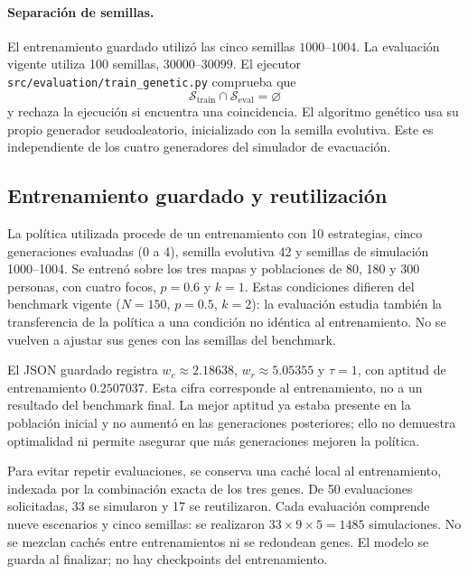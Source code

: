 \documentclass[11pt,letterpaper]{article}
\begin{document}
\paragraph{Separación de semillas.}
El entrenamiento guardado utilizó las cinco semillas $1000$--$1004$. La evaluación vigente utiliza 100 semillas, $30000$--$30099$. El ejecutor \texttt{src/evaluation/train\_genetic.py} comprueba que
\[
    \mathcal{S}_{\mathrm{train}}
    \cap
    \mathcal{S}_{\mathrm{eval}}
    =
    \varnothing
\]
y rechaza la ejecución si encuentra una coincidencia. El algoritmo genético usa su propio generador seudoaleatorio, inicializado con la semilla evolutiva. Este es independiente de los cuatro generadores del simulador de evacuación.





\subsection{Entrenamiento guardado y reutilización}

La política utilizada procede de un entrenamiento con 10 estrategias, cinco generaciones evaluadas (0 a 4), semilla evolutiva 42 y semillas de simulación 1000--1004. Se entrenó sobre los tres mapas y poblaciones de 80, 180 y 300 personas, con cuatro focos, $p=0.6$ y $k=1$. Estas condiciones difieren del benchmark vigente ($N=150$, $p=0.5$, $k=2$): la evaluación estudia también la transferencia de la política a una condición no idéntica al entrenamiento. No se vuelven a ajustar sus genes con las semillas del benchmark.

El JSON guardado registra $w_c\approx2.18638$, $w_r\approx5.05355$ y $\tau=1$, con aptitud de entrenamiento $0.2507037$. Esta cifra corresponde al entrenamiento, no a un resultado del benchmark final. La mejor aptitud ya estaba presente en la población inicial y no aumentó en las generaciones posteriores; ello no demuestra optimalidad ni permite asegurar que más generaciones mejoren la política.

Para evitar repetir evaluaciones, se conserva una caché local al entrenamiento, indexada por la combinación exacta de los tres genes. De 50 evaluaciones solicitadas, 33 se simularon y 17 se reutilizaron. Cada evaluación comprende nueve escenarios y cinco semillas: se realizaron $33\times9\times5=1485$ simulaciones. No se mezclan cachés entre entrenamientos ni se redondean genes. El modelo se guarda al finalizar; no hay checkpoints del entrenamiento.
\end{document}
